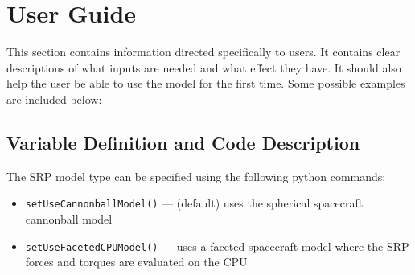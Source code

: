 \section{User Guide}
This section contains information directed specifically to users. It contains clear descriptions of what inputs are needed and what effect they have. It should also help the user be able to use the model for the first time. Some possible examples are included below:

\subsection{Variable Definition and Code Description}
The SRP model type can be specified using the following python commands:
\begin{itemize}
	\item {\tt setUseCannonballModel()} --- (default) uses the spherical spacecraft cannonball model
	\item {\tt setUseFacetedCPUModel()}  --- uses a faceted spacecraft model where the SRP forces and torques are evaluated on the CPU
\end{itemize}

